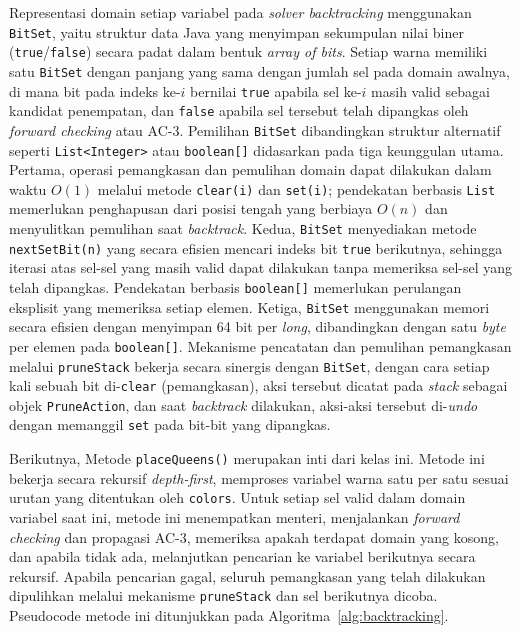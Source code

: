 Representasi domain setiap variabel pada \textit{solver backtracking} menggunakan \texttt{BitSet}, yaitu struktur data Java yang menyimpan sekumpulan nilai biner (\texttt{true}/\texttt{false}) secara padat dalam bentuk \textit{array of bits}. Setiap warna memiliki satu \texttt{BitSet} dengan panjang yang sama dengan jumlah sel pada domain awalnya, di mana bit pada indeks ke-$i$ bernilai \texttt{true} apabila sel ke-$i$ masih valid sebagai kandidat penempatan, dan \texttt{false} apabila sel tersebut telah dipangkas oleh \textit{forward checking} atau AC-3. Pemilihan \texttt{BitSet} dibandingkan struktur alternatif seperti \texttt{List<Integer>} atau \texttt{boolean[]} didasarkan pada tiga keunggulan utama. Pertama, operasi pemangkasan dan pemulihan domain dapat dilakukan dalam waktu $O(1)$ melalui metode \texttt{clear(i)} dan \texttt{set(i)}; pendekatan berbasis \texttt{List} memerlukan penghapusan dari posisi tengah yang berbiaya $O(n)$ dan menyulitkan pemulihan saat \textit{backtrack}. Kedua, \texttt{BitSet} menyediakan metode \texttt{nextSetBit(n)} yang secara efisien mencari indeks bit \texttt{true} berikutnya, sehingga iterasi atas sel-sel yang masih valid dapat dilakukan tanpa memeriksa sel-sel yang telah dipangkas. Pendekatan berbasis \texttt{boolean[]} memerlukan perulangan eksplisit yang memeriksa setiap elemen. Ketiga, \texttt{BitSet} menggunakan memori secara efisien dengan menyimpan 64 bit per \textit{long}, dibandingkan dengan satu \textit{byte} per elemen pada \texttt{boolean[]}. Mekanisme pencatatan dan pemulihan pemangkasan melalui \texttt{pruneStack} bekerja secara sinergis dengan \texttt{BitSet}, dengan cara setiap kali sebuah bit di-\texttt{clear} (pemangkasan), aksi tersebut dicatat pada \textit{stack} sebagai objek \texttt{PruneAction}, dan saat \textit{backtrack} dilakukan, aksi-aksi tersebut di-\textit{undo} dengan memanggil \texttt{set} pada bit-bit yang dipangkas.

Berikutnya, Metode \texttt{placeQueens()} merupakan inti dari kelas ini. Metode ini bekerja secara rekursif \textit{depth-first}, memproses variabel warna satu per satu sesuai urutan yang ditentukan oleh \texttt{colors}. Untuk setiap sel valid dalam domain variabel saat ini, metode ini menempatkan menteri, menjalankan \textit{forward checking} dan propagasi AC-3, memeriksa apakah terdapat domain yang kosong, dan apabila tidak ada, melanjutkan pencarian ke variabel berikutnya secara rekursif. Apabila pencarian gagal, seluruh pemangkasan yang telah dilakukan dipulihkan melalui mekanisme \texttt{pruneStack} dan sel berikutnya dicoba. Pseudocode metode ini ditunjukkan pada Algoritma~\ref{alg:backtracking}.

